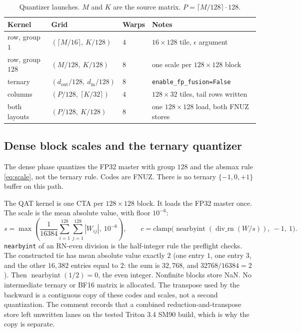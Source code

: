 \documentclass[11pt]{article}
\DeclareRobustCommand{\code}[1]{\texttt{#1}}
\newcommand{\rne}{\operatorname{div\_rn}}
\newcommand{\nearby}{\operatorname{nearbyint}}
\begin{document}
\begin{table}[t]
\centering
\caption{Quantizer launches. \(M\) and \(K\) are the source matrix. \(P=\lceil M/128\rceil\cdot 128\).}
\label{tab:quant-launch}
\small
\begin{tabular}{@{}llll@{}}
\toprule
Kernel & Grid & Warps & Notes \\
\midrule
row, group \(1\) & \((\lceil M/16\rceil,\ K/128)\) & \(4\) & \(16\times 128\) tile, \(\epsilon\) argument \\
row, group \(128\) & \((M/128,\ K/128)\) & \(8\) & one scale per \(128\times 128\) block \\
ternary & \((d_{\mathrm{out}}/128,\ d_{\mathrm{in}}/128)\) & \(8\) & \code{enable\_fp\_fusion=False} \\
columns & \((P/128,\ \lceil K/32\rceil)\) & \(4\) & \(128\times 32\) tiles, tail rows written \\
both layouts & \((P/128,\ K/128)\) & \(8\) & one \(128\times 128\) load, both FNUZ stores \\
\bottomrule
\end{tabular}
\end{table}

\subsection{Dense block scales and the ternary quantizer}

The dense phase quantizes the FP32 master with group \(128\) and the absmax
rule \eqref{eq:scale}, not the ternary rule. Codes are FNUZ. There is no
ternary \(\{-1,0,+1\}\) buffer on this path.

The QAT kernel is one CTA per \(128\times 128\) block. It loads the FP32
master once. The scale is the mean absolute value, with floor \(10^{-6}\):
\begin{equation}
s = \max\!\left(\frac{1}{16384}\sum_{i=1}^{128}\sum_{j=1}^{128}|W_{ij}|,\ 10^{-6}\right),
\qquad
c = \mathrm{clamp}\big(\nearby(\rne(W/s)),\ -1,\ 1\big).
\end{equation}
\code{nearbyint} of an RN-even division is the half-integer rule the
preflight checks. The constructed tie has mean absolute value exactly \(2\)
(one entry \(1\), one entry \(3\), and the other \(16{,}382\) entries equal
to \(2\): the sum is \(32{,}768\), and \(32768/16384=2\)). Then
\(\nearby(1/2)=0\), the even integer. Nonfinite blocks store NaN. No
intermediate ternary or BF16 matrix is allocated. The transpose used by the
backward is a contiguous copy of these codes and scales, not a second
quantization. The comment records that a combined reduction-and-transpose
store left unwritten lanes on the tested Triton 3.4 SM90 build, which is why
the copy is separate.
\end{document}
